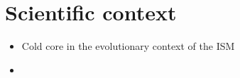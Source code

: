 \section{Scientific context} 
\begin{itemize}
\item{Cold core in the evolutionary context of the ISM}
\item{}
\end{itemize}
  
  